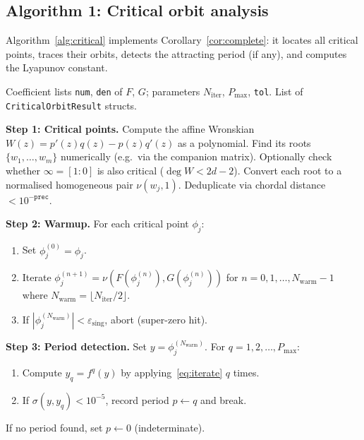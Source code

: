 \documentclass[12pt]{article}
\theoremstyle{definition}
\newcommand{\hpair}{[F:G]}
\begin{document}
\subsection{Algorithm 1: Critical orbit analysis}

Algorithm~\ref{alg:critical} implements Corollary~\ref{cor:complete}:
it locates all critical points, traces their orbits, detects the
attracting period (if any), and computes the Lyapunov constant.

\begin{algorithm}[h]
\caption{Critical orbit analysis for $f=\hpair$ of degree $d$}
\label{alg:critical}
\begin{algorithmic}[1]
\Require Coefficient lists \texttt{num}, \texttt{den} of $F$, $G$;
         parameters $N_{\mathrm{iter}}$, $P_{\max}$, \texttt{tol}.
\Ensure List of \texttt{CriticalOrbitResult} structs.

\State \textbf{Step 1: Critical points.}
  Compute the affine Wronskian $W(z)=p'(z)q(z)-p(z)q'(z)$ as a
  polynomial.  Find its roots $\{w_1,\ldots,w_m\}$ numerically
  (e.g.\ via the companion matrix).  Optionally check whether
  $\infty=[1:0]$ is also critical ($\deg W<2d-2$).
  Convert each root to a normalised homogeneous pair
  $\nu(w_j,1)$.  Deduplicate via chordal distance $<10^{-\texttt{prec}}$.

\State \textbf{Step 2: Warmup.}
  For each critical point $\phi_j$:
  \begin{enumerate}[label=\alph*.]
    \item Set $\phi_j^{(0)}=\phi_j$.
    \item Iterate $\phi_j^{(n+1)}=\nu(F(\phi_j^{(n)}),G(\phi_j^{(n)}))$
          for $n=0,1,\ldots,N_{\mathrm{warm}}-1$
          where $N_{\mathrm{warm}}=\lfloor N_{\mathrm{iter}}/2\rfloor$.
    \item If $|\phi_j^{(N_{\mathrm{warm}})}|<\varepsilon_{\mathrm{sing}}$,
          abort (super-zero hit).
  \end{enumerate}

\State \textbf{Step 3: Period detection.}
  Set $y=\phi_j^{(N_{\mathrm{warm}})}$.  For $q=1,2,\ldots,P_{\max}$:
  \begin{enumerate}[label=\alph*.]
    \item Compute $y_q = f^q(y)$ by applying~\eqref{eq:iterate} $q$ times.
    \item If $\sigma(y, y_q)<10^{-5}$, record period $p\leftarrow q$ and
          break.
  \end{enumerate}
  If no period found, set $p\leftarrow 0$ (indeterminate).


\end{algorithmic}
\end{algorithm}
\end{document}
